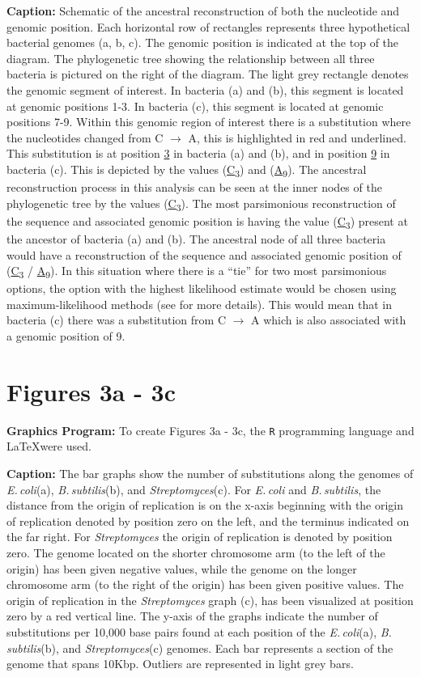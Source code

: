\documentclass[11pt]{article}
\newcommand{\strep}{\textit{Streptomyces}\xspace}
\newcommand{\ecol}{\textit{E.\,coli}\xspace}
\newcommand{\bass}{\textit{B.\,subtilis}\xspace}
\begin{document}
\textbf{Caption:} Schematic of the ancestral reconstruction of both the nucleotide and genomic position. Each horizontal row of rectangles represents three hypothetical bacterial genomes (a, b, c). The genomic position is indicated at the top of the diagram. The phylogenetic tree showing the relationship between all three bacteria is pictured on the right of the diagram. The light grey rectangle denotes the genomic segment of interest. In bacteria (a) and (b), this segment is located at genomic positions 1-3. In bacteria (c), this segment is located at genomic positions 7-9. Within this genomic region of interest there is a substitution where the nucleotides changed from C $\rightarrow$ A, this is highlighted in red and underlined. This substitution is at position \underline{3} in bacteria (a) and (b), and in position \underline{9} in bacteria (c). This is depicted by the values (\underline{C}\textsubscript{3}) and (\underline{A}\textsubscript{9}). The ancestral reconstruction process in this analysis can be seen at the inner nodes of the phylogenetic tree by the values (\underline{C}\textsubscript{3}). The most parsimonious reconstruction of the sequence and associated genomic position is having the value (\underline{C}\textsubscript{3}) present at the ancestor of bacteria (a) and (b). The ancestral node of all three bacteria would have a reconstruction of the sequence and associated genomic position of (\underline{C}\textsubscript{3} / \underline{A}\textsubscript{9}). In this situation where there is a ``tie'' for two most parsimonious options, the option with the highest likelihood estimate would be chosen using maximum-likelihood methods (see \citep{Yang97} for more details). This would mean that in bacteria (c) there was a substitution from C $\rightarrow$ A which is also associated with a genomic position of 9.

\section*{Figures 3a - 3c}
\textbf{Graphics Program:}
To create Figures 3a - 3c, the \texttt{R} programming language and \LaTeX were used.

\textbf{Caption:} The bar graphs show the number of substitutions along the genomes of \ecol (a), \bass (b), and \strep (c). For \ecol and \bass, the distance from the origin of replication is on the x-axis beginning with the origin of replication denoted by position zero on the left, and the terminus indicated on the far right. For \strep the origin of replication is denoted by position zero. The genome located on the shorter chromosome arm (to the left of the origin) has been given negative values, while the genome on the longer chromosome arm (to the right of the origin) has been given positive values. The origin of replication in the \strep graph (c), has been visualized at position zero by a red vertical line. The y-axis of the graphs indicate the number of substitutions per 10,000 base pairs found at each position of the \ecol (a), \bass (b), and \strep (c) genomes. Each bar represents a section of the genome that spans 10Kbp. Outliers are represented in light grey bars.
\end{document}
